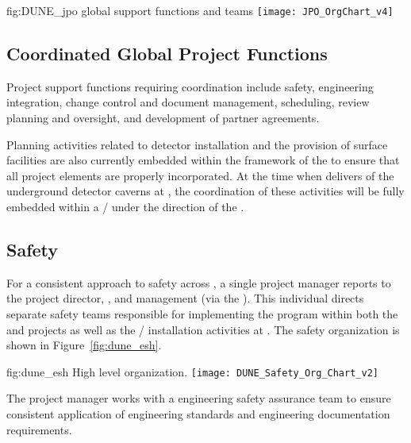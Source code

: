 \begin{dunefigure}{fig:DUNE_jpo}
  { global support functions and teams}
  \texttt{[image: JPO\_OrgChart\_v4]}
\end{dunefigure}


\subsection{Coordinated Global Project Functions}

Project support functions requiring  coordination include
safety, engineering integration, change control and document 
management, scheduling, review planning and oversight, and development 
of partner agreements.  

Planning activities related to detector installation and the provision 
of surface facilities are also currently embedded within the framework 
of the  to ensure that all project elements are properly 
incorporated.  At the time when   delivers 
 of the underground detector caverns at , the 
coordination of these activities will be fully embedded within 
a /  under the direction of the . 


\subsection{Safety}
\label{sec:dune_safety}


For a consistent approach to safety across ,
a single project  manager reports  
to the  project director, , and 
management (via the  ).  This individual
directs separate safety teams responsible for implementing the
  program within both the  
and  projects as well as the /
installation activities at . The safety organization 
is shown in Figure~\ref{fig:dune_esh}.

\begin{dunefigure}{fig:dune_esh}
  {High level   organization.}
  \texttt{[image: DUNE\_Safety\_Org\_Chart\_v2]}
\end{dunefigure}

The project  manager works with a  
engineering safety assurance team to ensure consistent application of engineering standards and engineering 
documentation requirements. %

